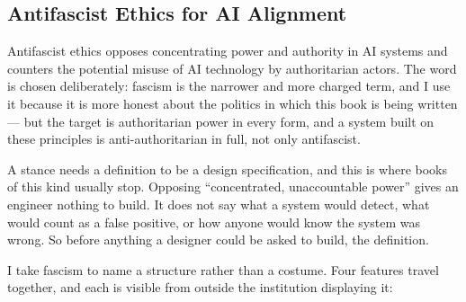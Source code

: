 \subsection{Antifascist Ethics for AI Alignment}
\label{sec:2.1.4}
Antifascist ethics opposes concentrating power and authority in AI systems and counters the potential misuse of AI technology by authoritarian actors. The word is chosen deliberately: fascism is the narrower and more charged term, and I use it because it is more honest about the politics in which this book is being written — but the target is authoritarian power in every form, and a system built on these principles is anti-authoritarian in full, not only antifascist.

A stance needs a definition to be a design specification, and this is where books of this kind usually stop. Opposing “concentrated, unaccountable power” gives an engineer nothing to build. It does not say what a system would detect, what would count as a false positive, or how anyone would know the system was wrong. So before anything a designer could be asked to build, the definition.

I take fascism to name a structure rather than a costume. Four features travel together, and each is visible from outside the institution displaying it:

